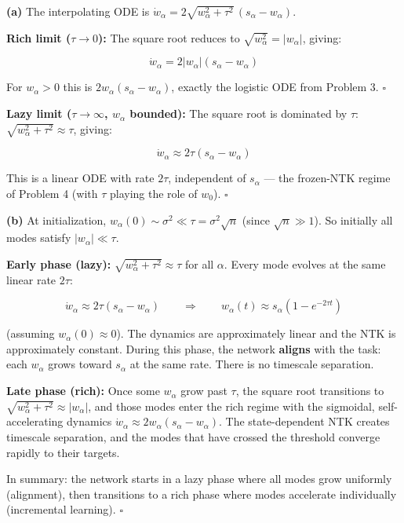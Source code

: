\documentclass[
]{article}
\begin{document}
\textbf{(a)} The interpolating ODE is
\(\dot{w}_\alpha = 2\sqrt{w_\alpha^2 + \tau^2}\,(s_\alpha - w_\alpha)\).

\textbf{Rich limit (\(\tau \to 0\)):} The square root reduces to
\(\sqrt{w_\alpha^2} = |w_\alpha|\), giving:

\[\dot{w}_\alpha = 2|w_\alpha|(s_\alpha - w_\alpha)\]

For \(w_\alpha > 0\) this is \(2w_\alpha(s_\alpha - w_\alpha)\), exactly
the logistic ODE from Problem 3. \(\square\)

\textbf{Lazy limit (\(\tau \to \infty\), \(w_\alpha\) bounded):} The
square root is dominated by \(\tau\):
\(\sqrt{w_\alpha^2 + \tau^2} \approx \tau\), giving:

\[\dot{w}_\alpha \approx 2\tau(s_\alpha - w_\alpha)\]

This is a linear ODE with rate \(2\tau\), independent of \(s_\alpha\)
--- the frozen-NTK regime of Problem 4 (with \(\tau\) playing the role
of \(w_0\)). \(\square\)

\textbf{(b)} At initialization,
\(w_\alpha(0) \sim \sigma^2 \ll \tau = \sigma^2\sqrt{n}\) (since
\(\sqrt{n} \gg 1\)). So initially all modes satisfy
\(|w_\alpha| \ll \tau\).

\textbf{Early phase (lazy):} \(\sqrt{w_\alpha^2 + \tau^2} \approx \tau\)
for all \(\alpha\). Every mode evolves at the same linear rate
\(2\tau\):

\[\dot{w}_\alpha \approx 2\tau(s_\alpha - w_\alpha) \qquad \Longrightarrow \qquad w_\alpha(t) \approx s_\alpha(1 - e^{-2\tau t})\]

(assuming \(w_\alpha(0) \approx 0\)). The dynamics are approximately
linear and the NTK is approximately constant. During this phase, the
network \textbf{aligns} with the task: each \(w_\alpha\) grows toward
\(s_\alpha\) at the same rate. There is no timescale separation.

\textbf{Late phase (rich):} Once some \(w_\alpha\) grow past \(\tau\),
the square root transitions to
\(\sqrt{w_\alpha^2 + \tau^2} \approx |w_\alpha|\), and those modes enter
the rich regime with the sigmoidal, self-accelerating dynamics
\(\dot{w}_\alpha \approx 2w_\alpha(s_\alpha - w_\alpha)\). The
state-dependent NTK creates timescale separation, and the modes that
have crossed the threshold converge rapidly to their targets.

In summary: the network starts in a lazy phase where all modes grow
uniformly (alignment), then transitions to a rich phase where modes
accelerate individually (incremental learning). \(\square\)
\end{document}
